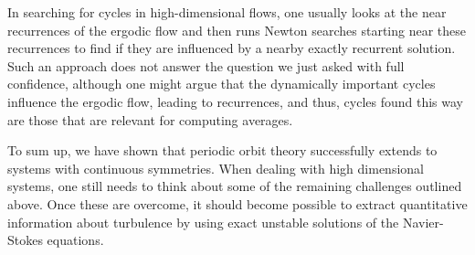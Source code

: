 In searching for cycles in high-dimensional flows, one usually looks at
the near recurrences of the ergodic flow and then runs Newton searches
starting near these recurrences to find if they are influenced by a nearby exactly
recurrent solution. Such an approach does not answer the question we just asked with full
confidence, although one might argue that the dynamically important cycles
influence the ergodic flow, leading to recurrences, and thus, cycles found this way are
those that are relevant for computing averages.

To sum up, we have shown that periodic orbit theory successfully 
extends to systems with continuous symmetries. When dealing with 
high dimensional systems, one still needs to think about some of the 
remaining challenges outlined above. Once these are overcome, it 
should become possible to extract quantitative information about 
turbulence by using exact unstable solutions of the Navier-Stokes 
equations.
